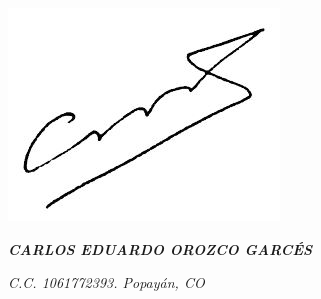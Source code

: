 \documentclass[american]{cv-class}
\begin{document}
\begin{flushright}
    	\emph{{\includegraphics[scale=0.55]{img/firma.JPG}}}
\end{flushright}
\begin{flushright}
	\emph{\textbf{CARLOS EDUARDO OROZCO GARCÉS}}
\end{flushright}
\begin{flushright}
	\emph{C.C. 1061772393. Popayán, CO}
\end{flushright}
\end{document}
